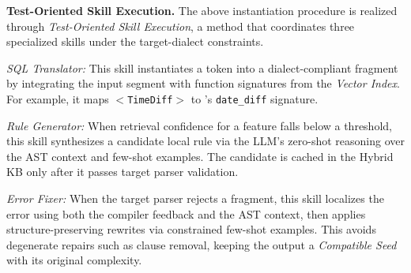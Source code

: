 \documentclass[conference]{IEEEtran}
\begin{document}
\textbf{Test-Oriented Skill Execution.} The above instantiation procedure is realized through \textit{Test-Oriented Skill Execution},
a method that coordinates three specialized skills under the target-dialect constraints.

\textit{SQL Translator:} This skill instantiates a token into a dialect-compliant fragment by integrating the input segment with function signatures from the \textit{Vector Index}. For example, it maps $<$\texttt{TimeDiff}$>$ to \duckdb{}'s \texttt{date\_diff} signature.

\textit{Rule Generator:} When retrieval confidence for a feature falls below a threshold, this skill synthesizes a candidate local rule via the LLM's zero-shot reasoning over the AST context and few-shot examples. The candidate is cached in the Hybrid KB only after it passes target parser validation.


\textit{Error Fixer:} When the target parser rejects a fragment, this skill localizes the error using both the compiler feedback and the AST context, then applies structure-preserving rewrites via constrained few-shot examples. This avoids degenerate repairs such as clause removal, keeping the output a \textit{Compatible Seed} with its original complexity.
\end{document}

